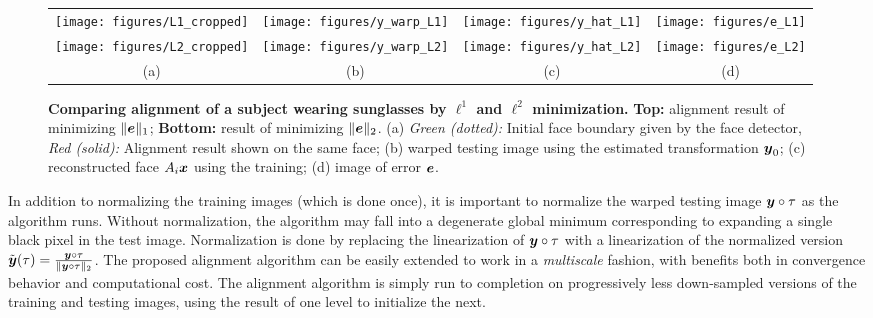 \documentclass[10pt,twocolumn,letterpaper]{article}
\begin{document}
\begin{figure}[t]
\centering
\begin{tabular}{cccc}
\texttt{[image: figures/L1\_cropped]} &
\texttt{[image: figures/y\_warp\_L1]} &
\texttt{[image: figures/y\_hat\_L1]} &
\texttt{[image: figures/e\_L1]} \\
\texttt{[image: figures/L2\_cropped]} &
\texttt{[image: figures/y\_warp\_L2]} &
\texttt{[image: figures/y\_hat\_L2]} &
\texttt{[image: figures/e\_L2]} \\
(a) & (b) & (c) & (d)
\end{tabular}
\caption{{\bf Comparing alignment of a subject wearing sunglasses by 
$\ell^1$ and $\ell^2$ minimization.} 
{\bf Top:} alignment result of minimizing $\|\boldsymbol{e}\|_1$; {\bf Bottom:} 
result of minimizing $\|\boldsymbol{e}\|_2$. (a) {\em Green (dotted):} Initial face boundary
given by the face detector, {\em Red (solid):} Alignment result shown on the same
face; (b) warped testing image using the estimated transformation ${\boldsymbol{y}}_0$; 
(c) reconstructed face $A_i{\boldsymbol{x}}$ using the training; (d) image of error $\boldsymbol{e}$. \vspace{-3mm}}\label{fig:L1-L2-align}
\vspace{-5mm}\end{figure}

In addition to normalizing the training images (which is done once), it is important to normalize the warped testing image ${\boldsymbol{y}} \circ \tau$ as the algorithm runs.  Without normalization, the algorithm may fall into a degenerate global minimum corresponding to expanding a single black pixel in the test image.  Normalization is done by replacing the linearization of ${\boldsymbol{y}} \circ \tau$ with a linearization of the normalized version $\tilde {{\boldsymbol{y}}}(\tau) = \frac{{\boldsymbol{y}} \circ \tau}{\|{\boldsymbol{y}} \circ \tau\|_2}$.  The proposed alignment algorithm can be easily extended to work in a {\em multiscale} fashion, with benefits both in convergence behavior and computational cost.  The alignment algorithm is simply run to completion on progressively less down-sampled versions of the training and testing images, using the result of one level to initialize the next.  \vspace{-3mm}
\end{document}
